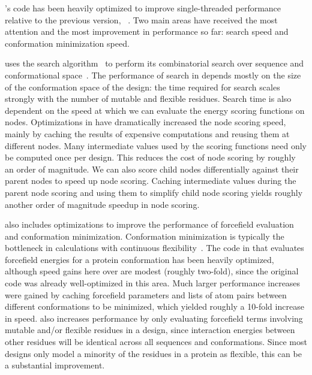 's code has been heavily optimized to improve single-threaded performance relative to the previous version, ~\cite{COMETS}. Two main areas have received the most attention and the most improvement in performance so far: \as search speed and conformation minimization speed.

\osprey uses the \as search algorithm~\cite{DEE/A*} to perform its combinatorial search over sequence and conformational space~\cite{minDEE,iMinDEE,DEEPer}.  The performance of \as search in \osprey depends mostly on the size of the conformation space of the design: the time required for search scales strongly with the number of mutable and flexible residues. Search time is also dependent on the speed at which we can evaluate the energy scoring functions on \as nodes. Optimizations in  have dramatically increased the \as node scoring speed, mainly by caching the results of expensive computations and reusing them at different nodes. Many intermediate values used by the \as scoring functions need only be computed once per design. This reduces the cost of node scoring by roughly an order of magnitude. We can also score child nodes differentially against their parent nodes to speed up node scoring. Caching intermediate values during the parent node scoring and using them to simplify child node scoring yields roughly another order of magnitude speedup in \as node scoring. %

 also includes optimizations to improve the performance of forcefield evaluation and conformation minimization. Conformation minimization is typically the bottleneck in \osprey calculations with continuous flexibility~\cite{minDEE,iMinDEE,DEEPer,CATS}.  The code in  that evaluates forcefield energies for a protein conformation has been heavily optimized, although speed gains here over  are modest (roughly two-fold), since the original code was already well-optimized in this area. Much larger performance increases were gained by caching forcefield parameters and lists of atom pairs between different conformations to be minimized, which yielded roughly a 10-fold increase in speed.  also increases performance by only evaluating forcefield terms involving mutable and/or flexible residues in a design, since interaction energies between other residues will be identical across all sequences and conformations.  Since most designs only model a minority of the residues in a protein as flexible, this can be a substantial improvement. 

